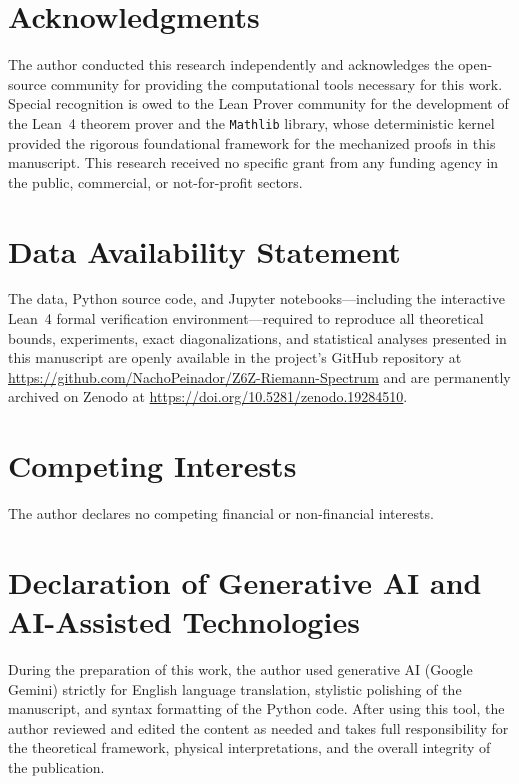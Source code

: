 \documentclass[11pt,a4paper]{article}
\begin{document}

\section*{Acknowledgments}
The author conducted this research independently and acknowledges the open-source community for providing the computational tools necessary for this work. Special recognition is owed to the Lean Prover community for the development of the Lean~4 theorem prover and the \texttt{Mathlib} library, whose deterministic kernel provided the rigorous foundational framework for the mechanized proofs in this manuscript. This research received no specific grant from any funding agency in the public, commercial, or not-for-profit sectors.

\section*{Data Availability Statement}
{\sloppy
The data, Python source code, and Jupyter notebooks---including the interactive Lean~4 formal verification environment---required to reproduce all theoretical bounds, experiments, exact diagonalizations, and statistical analyses presented in this manuscript are openly available in the project's GitHub repository at \url{https://github.com/NachoPeinador/Z6Z-Riemann-Spectrum} and are permanently archived on Zenodo at \url{https://doi.org/10.5281/zenodo.19284510}. 
\par}

\section*{Competing Interests}
The author declares no competing financial or non-financial interests.

\section*{Declaration of Generative AI and AI-Assisted Technologies}
During the preparation of this work, the author used generative AI (Google Gemini) strictly for English language translation, stylistic polishing of the manuscript, and syntax formatting of the Python code. After using this tool, the author reviewed and edited the content as needed and takes full responsibility for the theoretical framework, physical interpretations, and the overall integrity of the publication.
\end{document}
